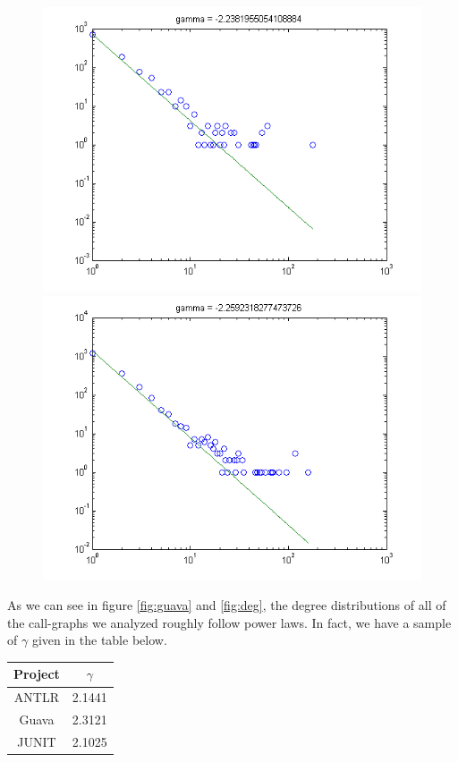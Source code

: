 \documentclass[11pt,a4paper,twocolumn]{article}
\begin{document}
\begin{singlespace}
\begin{figure}
\includegraphics[scale=0.5]{images/webmagic}
\includegraphics[scale=0.5]{images/xstream}
\end{figure}
As we can see in figure \ref{fig:guava} and \ref{fig:deg}, the degree distributions of
all of the call-graphs we analyzed roughly follow power laws. In fact, we have a sample of
$\gamma$ given in the table below.
\begin{table}[H]
\centering
\begin{tabular}{|c|c|} \hline
Project & $\gamma$ \\ \hline
ANTLR \cite{ANTLR} & 2.1441 \\
Guava \cite{Guava} & 2.3121 \\
JUNIT \cite{JUnit} & 2.1025 \\

\end{tabular}
\end{table}
\end{singlespace}
\end{document}
